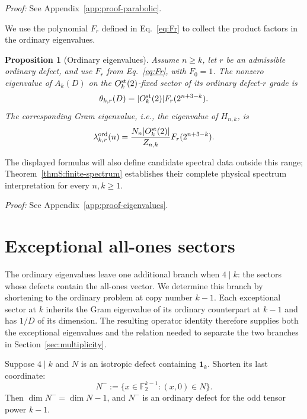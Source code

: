 \documentclass[journal,twocolumn]{IEEEtran}
\newtheorem{proposition}[theorem]{Proposition}
\theoremstyle{definition}
\theoremstyle{plain}
\newcommand{\F}{\mathbb F}
\newcommand{\Ord}{\mathrm{ord}}
\newcommand{\one}{\bm 1}
\begin{document}
\noindent\emph{Proof:} See Appendix~\ref{app:proof-parabolic}.\par

We use the polynomial $F_r$ defined in Eq.~\eqref{eq:Fr} to collect the
product factors in the ordinary eigenvalues.
\begin{proposition}[Ordinary eigenvalues]
\label{propS:eigenvalues}
Assume $n\geq k$, let $r$ be an admissible ordinary defect, and use
$F_r$ from Eq.~\eqref{eq:Fr}, with $F_0=1$.
The nonzero eigenvalue of $A_k(D)$ on the
$O_k^{\rm st}(2)$-fixed sector of its ordinary defect-$r$ grade is
\begin{equation}
 \theta_{k,r}(D)=|O_k^{\rm st}(2)|F_r(2^{n+3-k}).
 \label{eqS:theta}
\end{equation}
The corresponding Gram eigenvalue, i.e., the eigenvalue of $H_{n,k}$, is
\begin{equation}
 \lambda^{\Ord}_{k,r}(n)
 =\frac{N_n|O_k^{\rm st}(2)|}{Z_{n,k}}
 F_r(2^{n+3-k}).
 \label{eqS:lambda-finite}
\end{equation}
\end{proposition}
The displayed formulas will also define candidate spectral data outside
this range; Theorem~\ref{thmS:finite-spectrum} establishes their complete
physical spectrum interpretation for every $n,k\geq1$.

\noindent\emph{Proof:} See Appendix~\ref{app:proof-eigenvalues}.\par

\section{Exceptional all-ones sectors}
\label{sec:exceptional}
The ordinary eigenvalues leave one additional branch when $4\mid k$:
the sectors whose defects contain the all-ones vector.  We determine
this branch by shortening to the ordinary problem at copy number $k-1$.
Each exceptional sector at $k$ inherits the Gram eigenvalue of its
ordinary counterpart at $k-1$ and has $1/D$ of its dimension.
The resulting operator identity therefore
supplies both the exceptional eigenvalues and the relation needed to
separate the two branches in Section~\ref{sec:multiplicity}.

Suppose $4\mid k$ and $N$ is an isotropic defect containing $\one_k$.
Shorten its last coordinate:
\begin{equation}
 N^-:=\{x\in\F_2^{k-1}:(x,0)\in N\}.
 \label{eqS:shorten}
\end{equation}
Then $\dim N^-=\dim N-1$, and $N^-$ is an ordinary defect for the odd
tensor power $k-1$.
\end{document}
